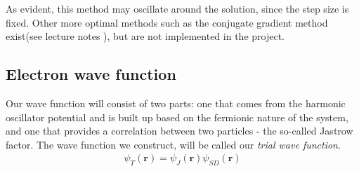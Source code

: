 \documentclass[11pt]{article}
\begin{document}
As evident, this method may oscillate around the solution, since the step size is fixed. Other more optimal methods such as the conjugate gradient method exist(see lecture notes \cite{komp2015}), but are not implemented in the project.


\subsection{Electron wave function}
Our wave function will consist of two parts: one that comes from the harmonic oscillator potential and is built up based on the fermionic nature of the system, and one that provides a correlation between two particles - the so-called Jastrow factor. The wave function we construct, will be called our \textit{trial wave function}.
\begin{align}
	\psi_T(\mathbf{r}) = \psi_J(\mathbf{r})\psi_{SD}(\mathbf{r})
	\label{eq:WF_trial}
\end{align}
\end{document}
